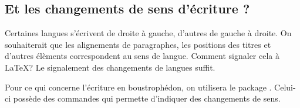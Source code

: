 \subsection{Et les changements de sens d'écriture ?}

Certaines langues s'écrivent de droite à gauche, d'autres de gauche à droite. On souhaiterait que les alignements de paragraphes, les positions des titres et d'autres élèments correspondent au sens de langue. 
Comment signaler cela à \LaTeX ? Le signalement des changements de langues suffit.

\begin{anedocte}
Pour ce qui concerne l'écriture en boustrophédon, on utilisera le package . Celui-ci possède des  commandes qui permette d'indiquer des changements de sens. 
\end{anedocte}
